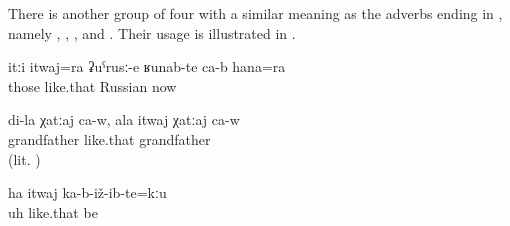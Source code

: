 There is another group of four  with a similar meaning as the adverbs ending in , namely , , , and  . Their usage is illustrated in .
%
\begin{exe}
	\ex	\label{ex:They are also like this, like Russians, even now}
	\gll	itːi	itwaj=ra	ʡuˁrusː-e	ʁunab-te	ca-b	hana=ra\\
		those	like.that	Russian	 		now\\
	\glt	{}

	\ex	\label{ex:(He) is my (real) grandfather. For you he is only an old man (lit. he is like a grandfather of yours)}
	\gll	di-la	χatːaj	ca-w,	ala	itwaj	χatːaj	ca-w\\
			grandfather			like.that	grandfather	\\
	\glt	{} (lit. )

	\ex	\label{ex:Uh, and so he did not marry}
	\gll	ha	itwaj	ka-b-iž-ib-te=kːu\\
		uh	like.that	be\\
	\glt	{}
\end{exe}

